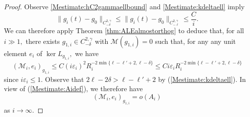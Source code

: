 \documentclass[12pt]{amsart}
\newcommand{\calM}{\mathcal{M}}
\renewcommand{\1}{{\mathbf 1}}
\newcommand{\eps}{{\varepsilon}}
\theoremstyle{others}
\numberwithin{equation}{section}
\begin{document}
\begin{proof}
    Observe \eqref{Mestimate:hC2gammaellbound} and \eqref{Mestimate:kdeltaell} imply
        $$\| g_i (t) - g_0 \|_{C^{2, \gamma}_{-\delta}} \le \| g_i (t) - g_0 \|_{C^{2, \gamma}_{-\ell} } \le \frac C i.$$
    We can therefore apply Theorem \ref{thm:ALEalmostorthog} to deduce that, for all $i \gg1,$ %
    there exists $g_{1,i} \in C^{2, \gamma}_{-\delta}$ with $\mathcal M(g_{1, i} ) = 0$ such that,
    for any any unit element $e_i$ of $\ker L_{g_{1,i}},$ we have
    \begin{equation}
        \left( \calM_i, e_i \right)_{g_{1,i}} \leq C (i \eps_i)^2 R_i^{-2 \min \{\ell - \ell' + 2, \ell - \delta \}} \leq C i \eps_i R_i^{-2 \min \{\ell - \ell' + 2, \ell - \delta \}}
    \end{equation}
    since $i \eps_i \leq 1.$ Observe that $2 \ell - 2 \delta > \ell - \ell' + 2$ by (\ref{Mestimate:kdeltaell}). In view of (\ref{Mestimate:Aidef}), we therefore have
    \begin{equation}\label{Mestimate:almostorthog}
    \left( \calM_i, e_i \right)_{g_{1,i}} %
    = o(A_i)
    \end{equation}
    as $i \to \infty.$


\end{proof}
\end{document}
